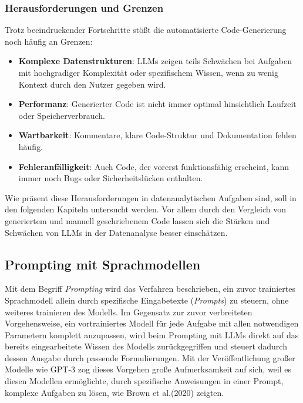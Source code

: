\documentclass[11pt,a4paper]{article}
\begin{document}
\subsubsection{Herausforderungen und Grenzen}
Trotz beeindruckender Fortschritte stößt die automatisierte Code-Generierung noch häufig an Grenzen:
\begin{itemize}
    \item \textbf{Komplexe Datenstrukturen}: LLMs zeigen teils Schwächen bei Aufgaben mit hochgradiger Komplexität oder spezifischem Wissen, wenn zu wenig Kontext durch den Nutzer gegeben wird\cite{dou2024whatswrongcodegenerated}.
    \item \textbf{Performanz}: Generierter Code ist nicht immer optimal hinsichtlich Laufzeit oder Speicherverbrauch\cite{huang2024effibenchbenchmarkingefficiencyautomatically}.
    \item \textbf{Wartbarkeit}: Kommentare, klare Code-Struktur und Dokumentation fehlen häufig\cite{dou2024whatswrongcodegenerated}.
    \item \textbf{Fehleranfälligkeit}: Auch Code, der vorerst funktionsfähig erscheint, kann immer noch Bugs oder Sicherheitslücken enthalten\cite{chen2021evaluatinglargelanguagemodels,dou2024whatswrongcodegenerated}.
\end{itemize}
Wie präsent diese Herausforderungen in datenanalytischen Aufgaben sind, soll in den folgenden Kapiteln untersucht werden. Vor allem durch den Vergleich von generiertem und manuell geschriebenem Code lassen sich die Stärken und Schwächen von LLMs in der Datenanalyse besser einschätzen.

\subsection{Prompting mit Sprachmodellen}
\label{sec:prompting}
Mit dem Begriff \emph{Prompting} wird das Verfahren beschrieben, ein zuvor trainiertes Sprachmodell allein durch spezifische Eingabetexte (\emph{Prompts}) zu steuern, ohne weiteres trainieren des Modells. Im Gegensatz zur zuvor verbreiteten Vorgehensweise, ein vortrainiertes Modell für jede Aufgabe mit allen notwendigen Parametern komplett anzupassen, wird beim Prompting mit LLMs direkt auf das bereits eingearbeitete Wissen des Modells zurückgegriffen und steuert dadurch dessen Ausgabe durch passende Formulierungen\cite{liu2021pretrainpromptpredictsystematic}. Mit der Veröffentlichung großer Modelle wie GPT-3 zog dieses Vorgehen große Aufmerksamkeit auf sich, weil es diesen Modellen ermöglichte, durch spezifische Anweisungen in einer Prompt, komplexe Aufgaben zu lösen, wie Brown et al.(2020)\cite{brown2020languagemodelsfewshotlearners} zeigten.
\end{document}
